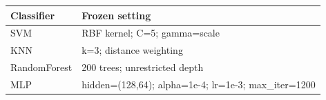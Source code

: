 \begin{tabular}{ll}
\toprule
Classifier & Frozen setting \\
\midrule
SVM & RBF kernel; C=5; gamma=scale \\
KNN & k=3; distance weighting \\
RandomForest & 200 trees; unrestricted depth \\
MLP & hidden=(128,64); alpha=1e-4; lr=1e-3; max\_iter=1200 \\
\bottomrule
\end{tabular}
